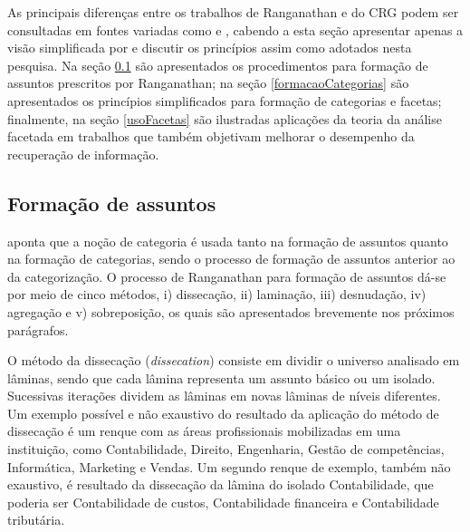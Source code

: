 As principais diferenças entre os trabalhos de Ranganathan e do CRG podem ser consultadas em fontes variadas como  e , cabendo a esta seção apresentar apenas a visão simplificada por  e discutir os princípios assim como adotados nesta pesquisa. Na seção \ref{formacaoAssuntos} são apresentados os procedimentos para formação de assuntos prescritos por Ranganathan; na seção \ref{formacaoCategorias} são apresentados os princípios simplificados para formação de categorias e facetas; finalmente, na seção \ref{usoFacetas} são ilustradas aplicações da teoria da análise facetada em trabalhos que também objetivam melhorar o desempenho da recuperação de informação.










\subsection{Formação de assuntos}
\label{formacaoAssuntos}

 aponta que a noção de categoria é usada tanto na formação de assuntos quanto na formação de categorias, sendo o processo de formação de assuntos anterior ao da categorização. O processo de Ranganathan para formação de assuntos dá-se por meio de cinco métodos, i) dissecação, ii) laminação, iii) desnudação, iv) agregação e v) sobreposição, os quais são apresentados brevemente nos próximos parágrafos.


O método da dissecação (\textit{dissecation}) consiste em dividir o universo analisado em lâminas, sendo que cada lâmina representa um assunto básico ou um isolado. Sucessivas iterações dividem as lâminas em novas lâminas de níveis diferentes. Um exemplo possível e não exaustivo do resultado da aplicação do método de dissecação é um renque com as áreas profissionais mobilizadas em uma instituição, como Contabilidade, Direito, Engenharia, Gestão de competências, Informática, Marketing e Vendas. Um segundo renque de exemplo, também não exaustivo, é resultado da dissecação da lâmina do isolado Contabilidade, que poderia ser Contabilidade de custos, Contabilidade financeira e Contabilidade tributária.

